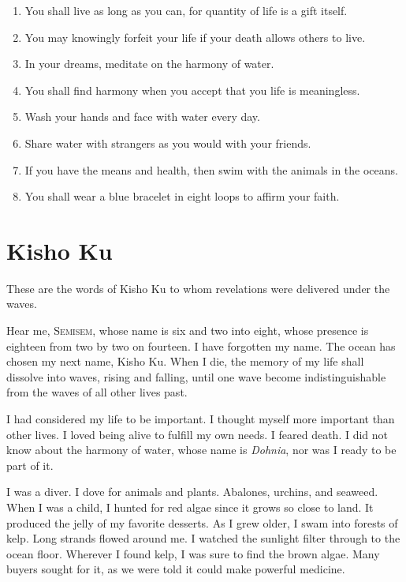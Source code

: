 \documentclass[12pt, letterpaper]{report}
\begin{document}
\begin{enumerate}
  \item You shall live as long as you can, for quantity of life is a gift itself.
  \item You may knowingly forfeit your life if your death allows others to live.
  \item In your dreams, meditate on the harmony of water.
  \item You shall find harmony when you accept that you life is meaningless.
  \item Wash your hands and face with water every day.
  \item Share water with strangers as you would with your friends.
  \item If you have the means and health, then swim with the animals in the oceans.
  \item You shall wear a blue bracelet in eight loops to affirm your faith.
\end{enumerate}

\chapter{Kisho Ku}

These are the words of Kisho Ku to whom revelations were delivered under the waves.

\vspace{1\baselineskip}
Hear me, S\textsc{emisem}, whose name is six and two into eight, whose presence is eighteen from two by two on fourteen. I have forgotten my name. The ocean has chosen my next name, Kisho Ku. When I die, the memory of my life shall dissolve into waves, rising and falling, until one wave become indistinguishable from the waves of all other lives past. 

\vspace{1\baselineskip}
I had considered my life to be important. I thought myself more important than other lives. I loved being alive to fulfill my own needs. I feared death. I did not know about the harmony of water, whose name is \textit{Dohnia}, nor was I ready to be part of it.

\vspace{1\baselineskip}
I was a diver. I dove for animals and plants. Abalones, urchins, and seaweed. When I was a child, I hunted for red algae since it grows so close to land. It produced the jelly of my favorite desserts. As I grew older, I swam into forests of kelp. Long strands flowed around me. I watched the sunlight filter through to the ocean floor. Wherever I found kelp, I was sure to find the brown algae. Many buyers sought for it, as we were told it could make powerful medicine. 
\end{document}
